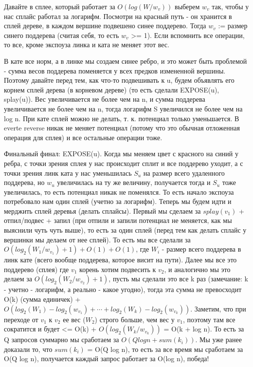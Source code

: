 Давайте в сплее, который работает за $O(log(W/w_v))$ выберем $w_v$ так, чтобы у нас сплайс работал за логарифм. Посмотри на красный путь - он хранится в сплей дереве, в каждом вершине подвешено синее поддерево. Тогда $w_v$ := размер синего поддерева (считая себя, то есть $w_v$ >= 1). Если вспомнить все операции, то все, кроме экспоуза линка и ката не меняет этот вес.

В кате все норм, а в линке мы создаем синее ребро, и это может быть проблемой - сумма весов поддерева поменяется у всех предков измененной вершины. Поэтому давайте перед тем, как что-то подвешивать к u, будем объявлять его корнем сплей дерева (в корневом дереве) (то есть сделали EXPOSE(u), splay(u)). Вес увеличивается не более чем на n, и сумма поддерева увеличивается не более чем на n, тогда логарифм S увеличился не более чем на log n. При кате сплей можно не делать, т. к. потенциал только уменьшается. В everte reverse никак не меняет потенциал (потому что это обычная отложенная операция для сплея) и все остальные операции тоже.

Финальный финал: EXPOSE(u). Когда мы меняем цвет с красного на синий у ребра, с точки зрения сплея у нас происходит сплит и все поддерево уходит, а с точки зрения линк ката у нас уменьшилась $S_u$ на размер всего удаленного поддерева, но $w_u$ увеличилась на ту же величину, получается тогда и $S_u$ тоже увеличилась, то есть потенциал никак не поменялся. То есть начало экспоуза потребовало нам один сплей (учетно за логарифм). Теперь мы будем идти и мерджить сплей деревья (делать сплайсы). Первый мы сделаем за $splay(v_1)$ + отпил/подвес + запил (при отпили и запили потенциал не меняется, как мы выяснили чуть чуть выше), то есть за один сплей (перед тем как делать сплайс у вершинки мы делаем от нее сплей). То есть мы все сделали за $O(log_2(W_1/w_{v_1})  + 1) + O(1) + O(1)$, где $W_i$ - размер всего поддерева в линк кате (всего вообще поддерева, которое висит на пути). Далее мы все это поддерево (сплея) где $v_1$ корень хотим подвесить к $v_2$, и аналогично мы это делаем за $O(log_2(W_2/w_{v_2}) + 1)$, пусть мы сделали это все k раз (замечание: k - учетно - логарифм, а реально - какое угодно), тогда эта сумма не превосходит O(k) (сумма единичек) + $O(log_2(W_1) - log_2(w_{v_1}) + \cdots + log_2(W_k) - log_2(w_{v_k}))$. Заметим, что при переходе от $v_1$ к $v_2$ ее вес ($W_2$) строго больше, чем вес у $v_1$, поэтому там все сократится и будет <= O(k) + $O(log_2(W_k/w_{v_k}))$ = O(k + log n). То есть за Q запросов суммарно мы сработаем за $O(Q log n + sum(k_i))$. Мы уже ранее доказали то, что $sum(k_i)$ = O(Q log n), то есть за все время мы сработаем за O(Q log n), получается каждый запрос работает за O(log n), победа!